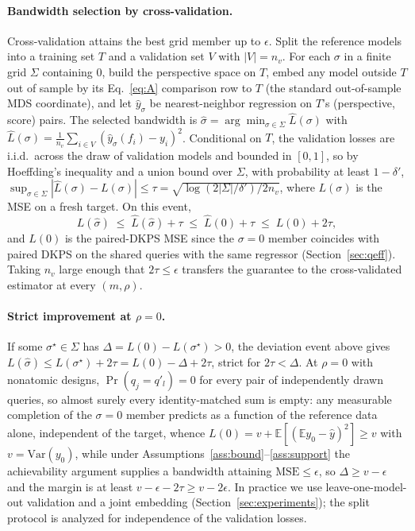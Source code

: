 \documentclass{article}
\theoremstyle{definition}
\theoremstyle{remark}
\theoremstyle{plain}
\begin{document}
\paragraph{Bandwidth selection by cross-validation.} Cross-validation attains
the best grid member up to $\epsilon$. Split the reference models into a training
set $T$ and a validation set $V$ with $|V|=n_v$. For each $\sigma$ in a finite grid
$\Sigma$ containing $0$, build the
perspective space on $T$, embed any model outside $T$ out of sample by its
Eq.~\eqref{eq:A} comparison row to $T$ (the standard out-of-sample MDS coordinate), and let
$\hat y_\sigma$ be nearest-neighbor regression on $T$'s (perspective, score) pairs. The
selected bandwidth is $\hat\sigma=\arg\min_{\sigma\in\Sigma}\hat L(\sigma)$ with
$\hat L(\sigma)=\tfrac1{n_v}\sum_{i\in V}(\hat y_\sigma(f_i)-y_i)^2$. Conditional on
$T$, the validation losses are i.i.d.\ across the draw of validation models and bounded
in $[0,1]$, so by Hoeffding's inequality and a union bound over $\Sigma$, with
probability at least $1-\delta'$,
$\sup_{\sigma\in\Sigma}|\hat L(\sigma)-L(\sigma)|\le
\tau=\sqrt{\log(2|\Sigma|/\delta')/2n_v}$, where $L(\sigma)$ is the MSE on a fresh
target. On this event,
\[
L(\hat\sigma)\;\le\;\hat L(\hat\sigma)+\tau\;\le\;\hat L(0)+\tau
\;\le\;L(0)+2\tau,
\]
and $L(0)$ is the paired-DKPS MSE since the $\sigma=0$ member coincides with paired
DKPS on the shared queries with the same regressor (Section~\ref{sec:qeff}). Taking
$n_v$ large enough that $2\tau\le\epsilon$ transfers the guarantee to the
cross-validated estimator at every $(m,\rho)$.

\paragraph{Strict improvement at $\rho=0$.} If some
$\sigma^\star\in\Sigma$ has $\Delta=L(0)-L(\sigma^\star)>0$, the deviation event
above gives $L(\hat\sigma)\le L(\sigma^\star)+2\tau=L(0)-\Delta+2\tau$,
strict for $2\tau<\Delta$. At $\rho=0$ with nonatomic designs,
$\Pr(q_j=q'_l)=0$ for every pair of independently drawn queries, so almost surely every
identity-matched sum is empty: any measurable completion of the $\sigma=0$ member
predicts as a function of the reference data alone, independent of the target, whence
$L(0)=v+\mathbb{E}[(\mathbb{E}y_{0}-\hat y)^2]\ge v$ with $v=\mathrm{Var}(y_{0})$,
while under
Assumptions~\ref{ass:bound}--\ref{ass:support} the achievability argument
supplies a bandwidth
attaining $\mathrm{MSE}\le\epsilon$, so $\Delta\ge v-\epsilon$ and the margin is at
least $v-\epsilon-2\tau\ge v-2\epsilon$. In practice we use leave-one-model-out
validation and a joint embedding (Section~\ref{sec:experiments}); the split protocol is
analyzed for independence of the validation losses.
\end{document}

